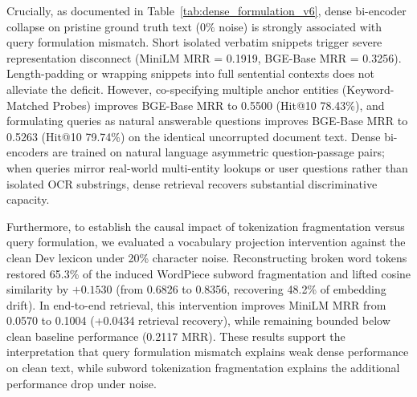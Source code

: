 \documentclass[conference]{IEEEtran}
\begin{document}
Crucially, as documented in Table~\ref{tab:dense_formulation_v6}, dense bi-encoder collapse on pristine ground truth text ($0\%$ noise) is strongly associated with query formulation mismatch. Short isolated verbatim snippets trigger severe representation disconnect (MiniLM MRR = 0.1919, BGE-Base MRR = 0.3256). Length-padding or wrapping snippets into full sentential contexts does not alleviate the deficit. However, co-specifying multiple anchor entities (Keyword-Matched Probes) improves BGE-Base MRR to 0.5500 (Hit@10 78.43\%), and formulating queries as natural answerable questions improves BGE-Base MRR to 0.5263 (Hit@10 79.74\%) on the identical uncorrupted document text. Dense bi-encoders are trained on natural language asymmetric question-passage pairs; when queries mirror real-world multi-entity lookups or user questions rather than isolated OCR substrings, dense retrieval recovers substantial discriminative capacity.

Furthermore, to establish the causal impact of tokenization fragmentation versus query formulation, we evaluated a vocabulary projection intervention against the clean Dev lexicon under 20\% character noise. Reconstructing broken word tokens restored 65.3\% of the induced WordPiece subword fragmentation and lifted cosine similarity by $+0.1530$ (from 0.6826 to 0.8356, recovering 48.2\% of embedding drift). In end-to-end retrieval, this intervention improves MiniLM MRR from 0.0570 to 0.1004 (+0.0434 retrieval recovery), while remaining bounded below clean baseline performance (0.2117 MRR). These results support the interpretation that query formulation mismatch explains weak dense performance on clean text, while subword tokenization fragmentation explains the additional performance drop under noise.

\begin{table}[t]
\centering\small
\caption{Dense Bi-Encoder Sensitivity to Query Formulation on Clean Ground-Truth Receipt Text ($0\%$ noise, Test $N=306$).}\label{tab:dense_formulation_v6}
\end{table}
\end{document}
